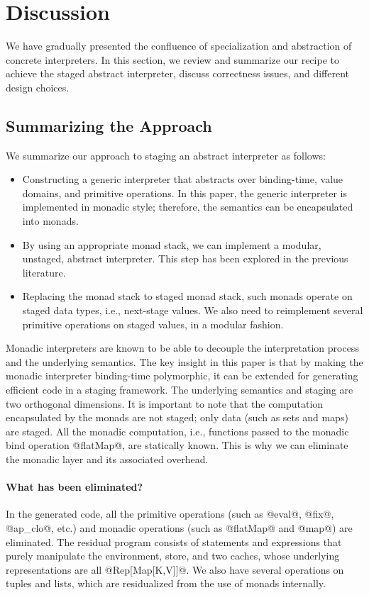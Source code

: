 \section{Discussion}

We have gradually presented the confluence of specialization and abstraction of
concrete interpreters. In this section, we review and summarize our recipe
to achieve the staged abstract interpreter, discuss correctness issues,
and different design choices.

\subsection{Summarizing the Approach}

We summarize our approach to staging an abstract interpreter as follows:

\begin{itemize}
  \item Constructing a generic interpreter that abstracts over binding-time,
    value domains, and primitive operations. In this paper, the generic interpreter
    is implemented in monadic style; therefore, the semantics can be encapsulated
    into monads.
  \item By using an appropriate monad stack, we can implement a modular, unstaged,
    abstract interpreter. This step has been explored in the previous literature.
  \item Replacing the monad stack to staged monad stack, such monads operate on
    staged data types, i.e., next-stage values. We also need to reimplement several
    primitive operations on staged values, in a modular fashion.
\end{itemize}

Monadic interpreters are known to be able to decouple the interpretation process
and the underlying semantics. The key insight in this paper is that by making the
monadic interpreter binding-time polymorphic, it can be extended for generating
efficient code in a staging framework. The underlying semantics and staging are
two orthogonal dimensions. It is important to note that the computation
encapsulated by the monads are not staged; only data (such as sets and maps) are
staged. All the monadic computation, i.e., functions passed to the monadic bind
operation @flatMap@, are statically known. This is why we can eliminate the
monadic layer and its associated overhead.

\paragraph{What has been eliminated?} In the generated code, all the
primitive operations (such as @eval@, @fix@, @ap_clo@, etc.) and monadic
operations (such as @flatMap@ and @map@) are eliminated. The residual program
consists of statements and expressions that purely manipulate the environment,
store, and two caches, whose underlying representations are all @Rep[Map[K,V]]@. We
also have several operations on tuples and lists, which are residualized from
the use of monads internally.

